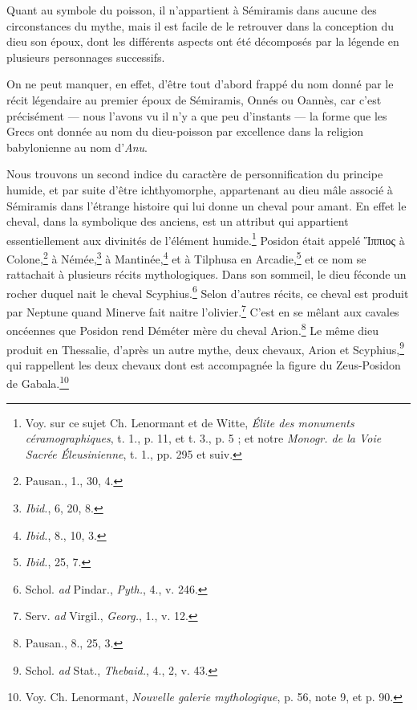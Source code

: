 \documentclass[a4paper, 11pt, oneside]{article}
\begin{document}
Quant au symbole du poisson, il n'appartient à Sémiramis dans aucune des circonstances du mythe, mais il est facile de le retrouver dans la conception du dieu son époux, dont les différents aspects ont été décomposés par la légende en plusieurs personnages successifs.

On ne peut manquer, en effet, d'être tout d'abord frappé du nom donné par le récit légendaire au premier époux de Sémiramis, Onnés ou Oannès, car c'est précisément --- nous l'avons vu il n'y a que peu d'instants --- la forme que les Grecs ont donnée au nom du dieu-poisson par excellence dans la religion babylonienne au nom d'\emph{Anu}.

Nous trouvons un second indice du caractère de personnification du principe humide, et par suite d'être ichthyomorphe, appartenant au dieu mâle associé à Sémiramis dans l'étrange histoire qui lui donne un cheval pour amant. En effet le cheval, dans la symbolique des anciens, est un attribut qui appartient essentiellement aux divinités de l'élément humide.\footnote{Voy. sur ce sujet Ch. Lenormant et de Witte, \emph{Élite des monuments céramographiques}, t. 1., p. 11, et t. 3., p. 5 ; et notre \emph{Monogr. de la Voie Sacrée Éleusinienne}, t. 1., pp. 295 et suiv.} Posidon était appelé Ἵππιος à Colone,\footnote{Pausan., 1., 30, 4.} à Némée,\footnote{\emph{Ibid.}, 6, 20, 8.} à Mantinée,\footnote{\emph{Ibid.}, 8., 10, 3.} et à Tilphusa en Arcadie,\footnote{\emph{Ibid.}, 25, 7.} et ce nom se rattachait à plusieurs récits mythologiques. Dans son sommeil, le dieu féconde un rocher duquel nait le cheval Scyphius.\footnote{Schol. \emph{ad} Pindar., \emph{Pyth.}, 4., v. 246.} Selon d'autres récits, ce cheval est produit par Neptune quand Minerve fait naitre l'olivier.\footnote{Serv. \emph{ad} Virgil., \emph{Georg.}, 1., v. 12.} C'est en se mêlant aux cavales oncéennes que Posidon rend Déméter mère du cheval Arion.\footnote{Pausan., 8., 25, 3.} Le même dieu produit en Thessalie, d'après un autre mythe, deux chevaux, Arion et Scyphius,\footnote{Schol. \emph{ad} Stat., \emph{Thebaid.}, 4., 2, v. 43.} qui rappellent les deux chevaux dont est accompagnée la figure du Zeus-Posidon de Gabala.\footnote{Voy. Ch. Lenormant, \emph{Nouvelle galerie mythologique}, p. 56, note 9, et p. 90.}
\end{document}
